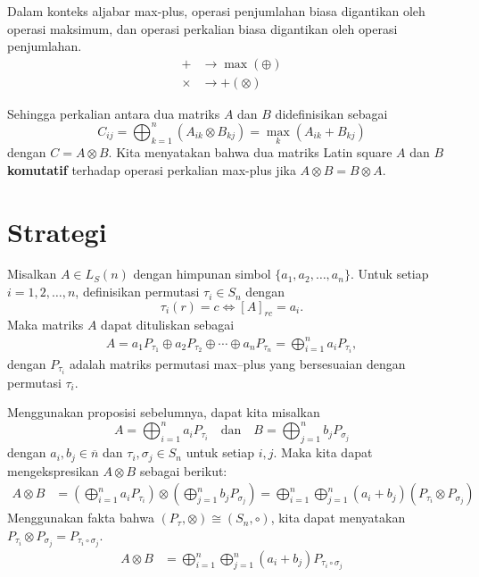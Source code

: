 \documentclass[aspectratio=169]{beamer}
\theoremstyle{definition}
\numberwithin{definisi}{subsection}
\begin{document}
\begin{frame}{\insertsection}
  Dalam konteks aljabar max-plus, operasi penjumlahan biasa digantikan oleh operasi maksimum, dan operasi perkalian biasa digantikan oleh operasi penjumlahan.
  \begin{align*}
    +      & \to \max (\oplus) \\
    \times & \to + (\otimes)
  \end{align*}

  Sehingga perkalian antara dua matriks $A$ dan $B$ didefinisikan sebagai
  $$C_{ij} = \bigoplus_{k=1}^n (A_{ik} \otimes B_{kj}) = \max_{k} (A_{ik} + B_{kj})$$
  dengan $C = A \otimes B$.
  Kita menyatakan bahwa dua matriks Latin square $A$ dan $B$ \textbf{komutatif} terhadap operasi perkalian max-plus jika $A \otimes B = B \otimes A$.
\end{frame}

\section{Strategi}
\begin{frame}{\insertsection}
  Misalkan $A \in L_S(n)$ dengan himpunan simbol
  $\{a_1, a_2, \ldots, a_n\}$.
  Untuk setiap $i = 1,2,\ldots,n$, definisikan permutasi $\tau_i \in S_n$ dengan
  \[
    \tau_i(r) = c \iff [A]_{r c} = a_i.
  \]
  Maka matriks $A$ dapat dituliskan sebagai
  \begin{align}
    A = a_1 P_{\tau_1} \oplus a_2 P_{\tau_2} \oplus \cdots \oplus a_n P_{\tau_n}
    = \bigoplus_{i=1}^{n} a_i P_{\tau_i},
  \end{align}
  dengan $P_{\tau_i}$ adalah matriks permutasi max--plus yang bersesuaian dengan permutasi
  $\tau_i$.
\end{frame}

\begin{frame}{\insertsection}
  Menggunakan proposisi sebelumnya, dapat kita misalkan
  \[A=\bigoplus_{i=1}^{n} a_i P_{\tau_i} \quad \text{dan} \quad B=\bigoplus_{j=1}^{n} b_j P_{\sigma_j}\]
  dengan $a_i, b_j \in \overline{n}$ dan $\tau_i, \sigma_j \in S_n$ untuk setiap $i, j$.
  Maka kita dapat mengekspresikan $A \otimes B$ sebagai berikut:
  \begin{align*}
    A \otimes B & = \left(\bigoplus_{i=1}^{n} a_i P_{\tau_i}\right) \otimes \left(\bigoplus_{j=1}^{n} b_j P_{\sigma_j}\right) = \bigoplus_{i=1}^{n} \bigoplus_{j=1}^{n} (a_i + b_j) (P_{\tau_i} \otimes P_{\sigma_j})
  \end{align*}
  Menggunakan fakta bahwa $(P_{\tau},\otimes) \cong (S_n, \circ)$, kita dapat menyatakan $P_{\tau_i} \otimes P_{\sigma_j} = P_{\tau_i \circ \sigma_j}$.
  \begin{align*}
    A \otimes B & = \bigoplus_{i=1}^{n} \bigoplus_{j=1}^{n} (a_i + b_j) P_{\tau_i \circ \sigma_j}
  \end{align*}
\end{frame}
\end{document}
